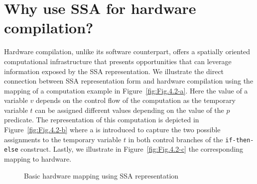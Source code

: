 \section{Why use SSA for hardware compilation?}
Hardware compilation, unlike its software counterpart, offers a spatially oriented computational infrastructure that presents opportunities that can leverage information exposed by the SSA representation. 
We illustrate the direct connection between SSA representation form and hardware compilation using the mapping of a computation example in Figure~\ref{fig:Fig.4.2-a}. 
Here the value of a variable $v$ depends on the control flow of the computation as the temporary variable $t$ can be assigned different values depending on the value of the $p$ predicate. 
The representation of this computation is depicted in Figure~\ref{fig:Fig.4.2-b} where a \phifun is introduced to capture the two possible assignments to the temporary variable $t$ in both control branches of the {\tt if-then-else} construct. 
Lastly, we illustrate in Figure~\ref{fig:Fig.4.2-c} the corresponding mapping to hardware.

\begin{figure}[htbp]
  \centering
\caption{Basic hardware mapping using SSA representation}
\label{fig:Fig.4.2}
\end{figure}

